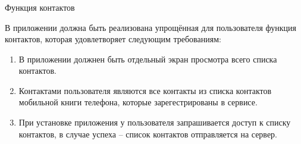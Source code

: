 \subsubsection{} Функция контактов
\label{sec:analysis:research:funcreq:contacts}

В приложении должна быть реализована упрощённая для пользователя функция контактов, которая удовлетворяет следующим требованиям:

\begin{enumerate}
	\item В приложении должнен быть отдельный экран просмотра всего списка контактов.
	\item Контактами пользователя являются все контакты из списка контактов мобильной книги телефона, которые зарегестрированы в сервисе.
	\item При установке приложения у пользователя запрашивается доступ к списку контактов, в случае успеха -- список контактов отправляется на сервер.
\end{enumerate}